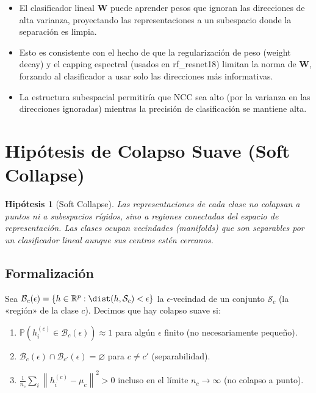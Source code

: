 \documentclass[12pt,a4paper]{report}
\newtheorem{hypothesis}{Hipótesis}[chapter]
\newcommand{\R}{\mathbb{R}}
\newcommand{\norm}[1]{\left\lVert#1\right\rVert}
\newcommand{\NCC}{\text{NCC}}
\begin{document}
\begin{itemize}
    \item El clasificador lineal $\mathbf{W}$ puede aprender pesos que ignoran las direcciones de alta varianza, proyectando las representaciones a un subespacio donde la separación es limpia.

    \item Esto es consistente con el hecho de que la regularización de peso (weight decay) y el capping espectral (usados en rf\_resnet18) limitan la norma de $\mathbf{W}$, forzando al clasificador a usar solo las direcciones más informativas.

    \item La estructura subespacial permitiría que $\NCC$ sea alto (por la varianza en las direcciones ignoradas) mientras la precisión de clasificación se mantiene alta.
\end{itemize}

\section{Hipótesis de Colapso Suave (Soft Collapse)}
\label{sec:soft}

\begin{hypothesis}[Soft Collapse]
Las representaciones de cada clase no colapsan a puntos ni a subespacios rígidos, sino a regiones conectadas del espacio de representación. Las clases ocupan vecindades (manifolds) que son separables por un clasificador lineal aunque sus centros estén cercanos.
\end{hypothesis}

\subsection{Formalización}

Sea $\mathcal{B}_c(\epsilon) = \{h \in \R^p : \dist(h, \mathcal{S}_c) < \epsilon\}$ la $\epsilon$-vecindad de un conjunto $\mathcal{S}_c$ (la «región» de la clase $c$). Decimos que hay colapso suave si:

\begin{enumerate}
    \item $\mathbb{P}(h_i^{(c)} \in \mathcal{B}_c(\epsilon)) \approx 1$ para algún $\epsilon$ finito (no necesariamente pequeño).
    \item $\mathcal{B}_c(\epsilon) \cap \mathcal{B}_{c'}(\epsilon) = \varnothing$ para $c \neq c'$ (separabilidad).
    \item $\frac{1}{n_c}\sum_i \norm{h_i^{(c)} - \mu_c}^2 > 0$ incluso en el límite $n_c \to \infty$ (no colapso a punto).
\end{enumerate}
\end{document}
